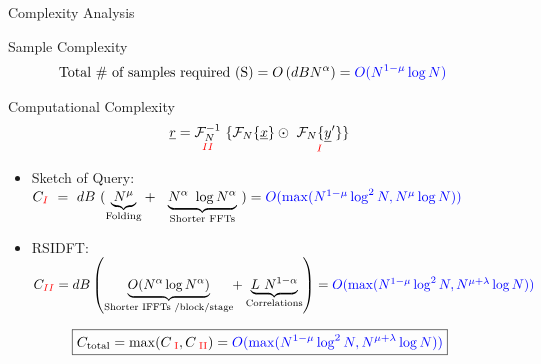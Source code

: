 \begin{frame}{Complexity Analysis}
	\begin{block}{Sample Complexity}
		\vspace{-10pt}
		\begin{align*}
		\text{Total \# of samples required (S)} &= O \left(dBN^{\alpha}\right) =   {\color{blue}O(N^{1-\mu}\log N)}
		\end{align*}
		
	\end{block}
	\begin{block}{Computational Complexity}
		\begin{equation*}\label{eqn:Rxy_fourier}
		\rv = \underset{\color{red}  \RNum{2} } {\mathcal{F}_{N}^{-1}} \ \{   \mathcal{F}_{N}\{\xv\}  \odot \ \underset{\color{red}  \RNum{1}  }{ \mathcal{F}_{N}\{\yv'\}}  \}
		\end{equation*}
		\vspace{-10pt}
	\begin{itemize}
		\item {\color{blue}Sketch of Query:}\\ \vspace{5pt}
	 {\small $C_{\color{red}\RNum{1}} \ = \  dB ~
	 ( \underset{\text{Folding} }{\underbrace{N^{\mu}}} + \ \
	 \underset{\text{Shorter FFTs} }{\underbrace{N^{\alpha} \ \log N^{\alpha}}} \ )
	 =  {\color{blue} O(\max(N^{1-\mu}\log^2 N ,N^{\mu}\log N)) }$}

		\item {\color{blue}RSIDFT:} \\	{\small$C_{\color{red} \RNum{2}} =  {d B}  \left (
			\underset{\text{Shorter IFFTs /block/stage} }{\underbrace{ O(N^{\alpha}  \log N^{\alpha})}} \hspace{-3pt}+ \underset{\text{Correlations} }{\underbrace{ L~N^{1-\alpha}}} \right ) = {\color{blue} O(\max(N^{1-\mu}\log^2 N ,N^{\mu+\lambda}\log N)) }$}
	\end{itemize}
	\vspace{10pt}	
	\[\boxed{C_{\text{total}} = \max(C_{\color{red} \text{ \RNum{1}}},C_{\color{red} \text{ \RNum{2}}}) = {\color{blue} O(\max(N^{1-\mu}\log^2 N ,N^{\mu+\lambda}\log N)) }}\]
		
	\end{block}
\end{frame}


